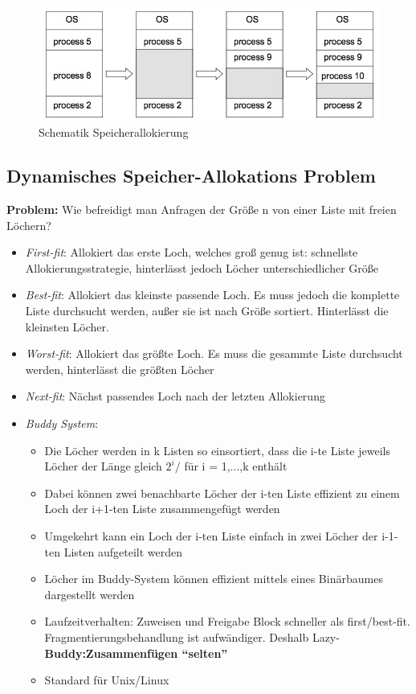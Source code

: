 \documentclass[a4paper]{scrreprt}
\begin{document}
\begin{figure}[ht]
\centering
\includegraphics[scale=0.6]{graphics/allocation.png}
\caption{Schematik Speicherallokierung}
\end{figure}

\subsection{Dynamisches Speicher-Allokations Problem}
\textbf{Problem:} Wie befreidigt man Anfragen der Größe n von einer Liste mit freien Löchern?
\begin{itemize}
\item \textit{First-fit}: Allokiert das erste Loch, welches groß genug ist: schnellste Allokierungsstrategie, hinterlässt jedoch Löcher unterschiedlicher Größe
\item \textit{Best-fit}: Allokiert das kleinste passende Loch. Es muss jedoch die komplette Liste durchsucht werden, außer sie ist nach Größe sortiert. Hinterlässt die kleinsten Löcher.
\item \textit{Worst-fit}: Allokiert das größte Loch. Es muss die gesammte Liste durchsucht werden, hinterlässt die größten Löcher
\item \textit{Next-fit}: Nächst passendes Loch nach der letzten Allokierung
\item \textit{Buddy System}:
\begin{itemize}
\item Die Löcher werden in k Listen so einsortiert, dass die i-te Liste jeweils Löcher der Länge gleich $2^i/$ für i = 1,...,k enthält
\item Dabei können zwei benachbarte Löcher der i-ten Liste effizient zu einem  Loch der i+1-ten Liste zusammengefügt werden
\item Umgekehrt kann ein Loch der i-ten Liste einfach in zwei Löcher der i-1-ten Listen aufgeteilt werden
\item Löcher im Buddy-System können effizient mittels eines Binärbaumes dargestellt werden
\item Laufzeitverhalten: Zuweisen und Freigabe Block schneller als first/best-fit. Fragmentierungsbehandlung ist aufwändiger. Deshalb Lazy-\textbf{Buddy:Zusammenfügen "`selten"'}
\item Standard für Unix/Linux
\end{itemize}
\end{itemize}
\end{document}
